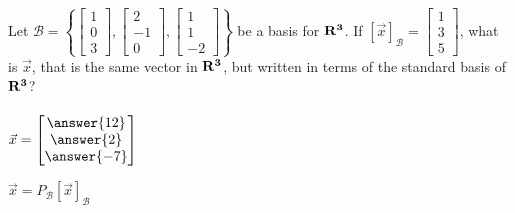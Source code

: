 \documentclass{ximera}
\newcommand{\RR}{\bf R}
\begin{document}
    \begin{question}
    	Let $\mathcal{B} = \left\{ \begin{bmatrix} 1\\0\\3\end{bmatrix}, \begin{bmatrix}
    	2\\-1\\0\end{bmatrix}, \begin{bmatrix} 1\\1\\-2\end{bmatrix}   \right\}$ be a basis for $\RR^3$. If $[\vec{x}]_{\mathcal{B}} = \begin{bmatrix} 1\\3\\5\end{bmatrix}$, what is $\vec{x}$, that is the same vector in $\RR^3$, but written in terms of the standard basis of $\RR^3$?\\
    		\\
    		$\vec{x} = \begin{bmatrix} \answer{12}\\\answer{2}\\ \answer{-7}\end{bmatrix}$
    		
    		\begin{hint} $\vec{x} = P_{\mathcal{B}} [\vec{x}]_{\mathcal{B}}$
    			\end{hint}
    \end{question}	
\end{document}
